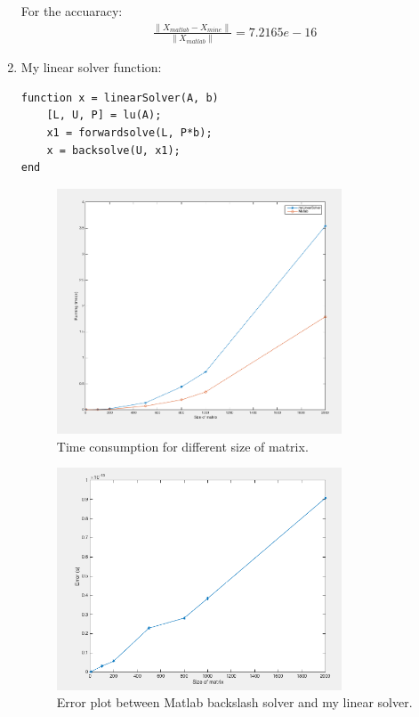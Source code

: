 \documentclass{article}
\begin{document}
\begin{enumerate}
 For the accuaracy: 
 \begin{align} 
\frac{ \|X_{matlab} - X_{mine} \| }{\|X_{matlab} \| }=  7.2165e-16
 \end{align} 
 
\item My linear solver function: \\
\begin{lstlisting} 
function x = linearSolver(A, b)     
    [L, U, P] = lu(A);
    x1 = forwardsolve(L, P*b); 
    x = backsolve(U, x1); 
end 
\end{lstlisting} 

\begin{figure}
\centering
\includegraphics[width=0.8\textwidth]{time}
\caption{Time consumption for different size of matrix.}
\end{figure}

\begin{figure}
\centering
\includegraphics[width=0.8\textwidth]{error}
\caption{Error plot between Matlab backslash solver and my linear solver.}
\end{figure}

\end{enumerate}
\end{document}
